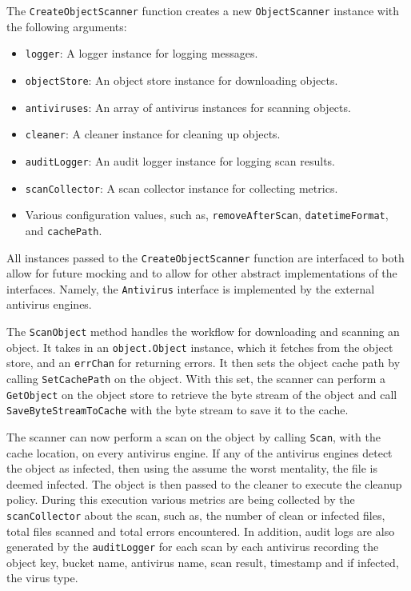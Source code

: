 \documentclass[12pt, conference, final, a4paper, onecolumn, compsoc]{IEEEtran}
\begin{document}
The \texttt{CreateObjectScanner} function creates a new \texttt{ObjectScanner}
instance with the following arguments:

\medskip
\begin{itemize}
  \item \texttt{logger}: A logger instance for logging messages.
  \item \texttt{objectStore}: An object store instance for downloading objects.
  \item \texttt{antiviruses}: An array of antivirus instances for scanning
        objects.
  \item \texttt{cleaner}: A cleaner instance for cleaning up objects.
  \item \texttt{auditLogger}: An audit logger instance for logging scan results.
  \item \texttt{scanCollector}: A scan collector instance for collecting
        metrics.
  \item Various configuration values, such as, \texttt{removeAfterScan},
        \texttt{datetimeFormat}, and \texttt{cachePath}.
\end{itemize}

All instances passed to the \texttt{CreateObjectScanner} function are interfaced
to both allow for future mocking and to allow for other abstract implementations
of the interfaces. Namely, the \texttt{Antivirus} interface is implemented by
the external antivirus engines.

The \texttt{ScanObject} method handles the workflow for downloading and scanning
an object. It takes in an \texttt{object.Object} instance, which it fetches from
the object store, and an \texttt{errChan} for returning errors. It then sets the
object cache path by calling \texttt{SetCachePath} on the object. With this set,
the scanner can perform a \texttt{GetObject} on the object store to retrieve the
byte stream of the object and call \texttt{SaveByteStreamToCache} with the byte
stream to save it to the cache.

The scanner can now perform a scan on the object by calling \texttt{Scan}, with
the cache location, on every antivirus engine. If any of the antivirus engines
detect the object as infected, then using the assume the worst mentality, the
file is deemed infected. The object is then passed to the cleaner to execute the
cleanup policy. During this execution various metrics are being collected by the
\texttt{scanCollector} about the scan, such as, the number of clean or infected
files, total files scanned and total errors encountered. In addition, audit logs
are also generated by the \texttt{auditLogger} for each scan by each antivirus
recording the object key, bucket name, antivirus name, scan result, timestamp
and if infected, the virus type.
\end{document}
